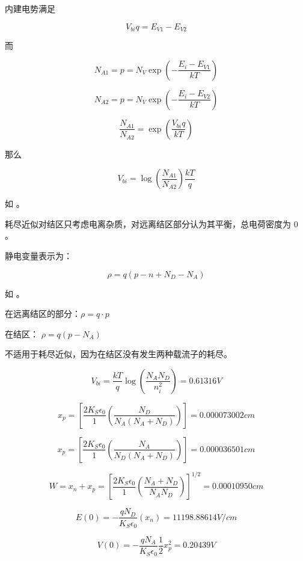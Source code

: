 \documentclass[lang=cn,11pt,a4paper,cite=authoryear]{elegantpaper}
\begin{document}

内建电势满足

\[V_{bi} q = E_{V1} - E_{V2} \]

而 

\[N_{A1} = p = N_V \exp (- \frac{E_i - E_{V1}}{kT})\]

\[N_{A2} = p = N_V \exp (- \frac{E_i - E_{V2}}{kT})\]

\[\frac{N_{A1}}{N_{A2}} = \exp(\frac{V_{bi}q}{kT})\]

那么 

\[V_{bi} = \log(\frac{N_{A1}}{N_{A2}}) \frac{kT}{q}\]


如 。


耗尽近似对结区只考虑电离杂质，对远离结区部分认为其平衡，总电荷密度为 0 。


静电变量表示为： 

\[\rho =  q (p - n + N_D - N_A)\]


如 。

在远离结区的部分：\(\rho = q \cdot p\)

在结区： \(\rho = q (p - N_A)\)


不适用于耗尽近似，因为在结区没有发生两种载流子的耗尽。



\[V_{bi} = \frac{kT}{q} \log(\frac{N_A N_D}{n_i^2}) = 0.61316 V\] 


\[x_p = \left[\frac{2 K_S \epsilon_0}{1} \left(\frac{N_D}{N_A(N_A+N_D)}\right)\right] = 0.000073002 cm\]

\[x_p = \left[\frac{2 K_S \epsilon_0}{1} \left(\frac{N_A}{N_D(N_A+N_D)}\right)\right] = 0.000036501 cm\]

\[W = x_n + x_p = \left[\frac{2 K_S \epsilon_0}{1} \left(\frac{N_A + N_D}{N_AN_D}\right)\right]^{1/2} = 0.00010950 cm \]


\[E(0) = - \frac{q N_D}{K_S \epsilon_0} (x_n) = 11198.88614 V/cm \]

\[V(0) = - \frac{q N_A}{K_S \epsilon_0} \frac{1}{2} x_p^2 = 0.20439 V\]
\end{document}
